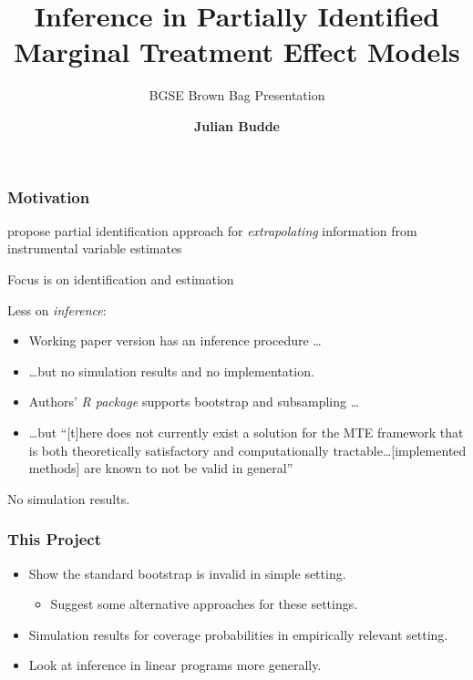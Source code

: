 \documentclass[11pt, aspectratio=169]{beamer}
\title{Inference in Partially Identified Marginal Treatment Effect Models}
\subtitle{BGSE Brown Bag Presentation}
\author[Julian Budde]{\bf Julian Budde}
\begin{document}
\begin{frame}
    \titlepage
    \note{~}
\end{frame}

\begin{frame}
    \frametitle{Motivation}

    \citet{mogstad2018using} propose partial identification approach for \textit{extrapolating} information from instrumental variable estimates

    \vspace{0.5cm}

    Focus is on identification and estimation

    \vspace{0.5cm}

    Less on \textit{inference}:

    \vspace{0.5cm}
    \pause
    \begin{itemize}
        \footnotesize
        \item Working paper version has an inference procedure \dots
        \item \dots but no simulation results and no implementation.
        \pause
        \item Authors' \textit{R package} supports bootstrap and subsampling \dots
        \item \dots but ``[t]here does not currently exist a solution for the MTE framework that is both theoretically
        satisfactory and computationally tractable\dots [implemented methods] are known to not be valid in general''
    \end{itemize}

    \vspace{0.5cm}
    No simulation results.

\end{frame}

\begin{frame}
    \frametitle{This Project}

    \begin{itemize}
        \item Show the standard bootstrap is invalid in simple setting.
        \begin{itemize}
            \item Suggest some alternative approaches for these settings.
        \end{itemize}
        \item Simulation results for coverage probabilities in empirically relevant setting.
        \item Look at inference in linear programs more generally.
    \end{itemize}

\end{frame}
\end{document}
